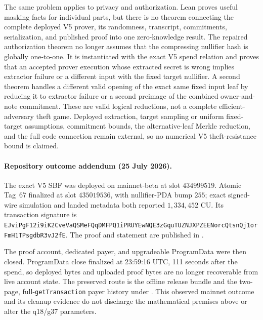 The same problem applies to privacy and authorization.  Lean proves useful
masking facts for individual parts, but there is no theorem connecting the
complete deployed V5 prover, its randomness, transcript, commitments,
serialization, and published proof into one zero-knowledge result.  The
repaired authorization theorem no longer assumes that the compressing
nullifier hash is globally one-to-one.  It is instantiated with the exact V5
spend relation and proves that an accepted prover execution whose extracted
secret is wrong implies extractor failure or a different input with the fixed
target nullifier.  A second theorem handles a different valid opening of the
exact same fixed input leaf by reducing it to extractor failure or a second
preimage of the combined owner-and-note commitment.  These are valid logical
reductions, not a complete efficient-adversary theft game.  Deployed extraction,
target sampling or uniform fixed-target assumptions, commitment bounds, the
alternative-leaf Merkle reduction, and the full code connection remain
external, so no numerical V5 theft-resistance bound is claimed.

\paragraph{Repository outcome addendum (25 July 2026).}
The exact V5 SBF was deployed on mainnet-beta at slot \(434999519\).  Atomic
Tag~67 finalized at slot \(435019536\), with nullifier-PDA bump
\(255\); exact signed-wire simulation and landed metadata both reported
\(1{,}334{,}452\) CU.  Its transaction signature is
\nolinkurl{EJviPgF12i9iK2CveVaQSMeFQqDMFPQ1iPRUYEwNQE3zGquTUZNJXPZEENorcQtsnQj1orFmH1TPsgdbR3vJ2fE}.
The proof and statement are published in
.

The proof account, dedicated payer, and upgradeable ProgramData were then
closed.  ProgramData close finalized at 23:59:16 UTC, 111 seconds after the
spend, so deployed bytes and uploaded proof bytes are no longer recoverable
from live account state.  The preserved route is the offline release bundle
and the two-page, full-\texttt{getTransaction} payer history under
.  This observed mainnet
outcome and its cleanup evidence do not discharge the mathematical premises
above or alter the q18/g37 parameters.
